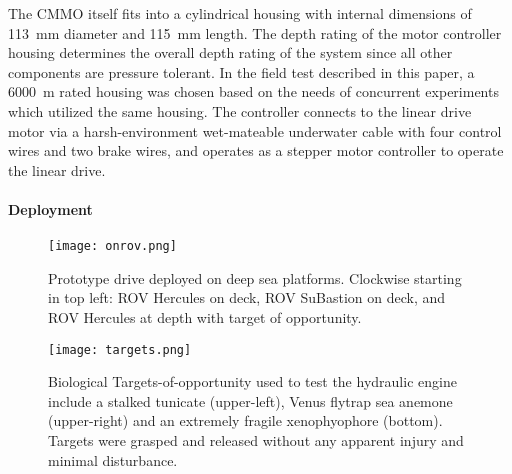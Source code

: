 The CMMO itself fits into a  cylindrical housing with
internal dimensions of \SI{113}{\mm} diameter and \SI{115}{\mm} length. The depth
rating of the motor controller housing determines the overall depth
rating of the system since all other components are pressure tolerant.
In the field test described in this paper, a \SI{6000}{\meter} rated housing
was chosen based on the needs of concurrent experiments which utilized
the same housing. The controller connects to the linear drive motor via
a harsh-environment wet-mateable underwater cable with four control
wires and two brake wires, and operates as a stepper motor controller to
operate the linear drive.


\hypertarget{ch1:deployment}{%
\paragraph{Deployment}\label{ch1:deployment}}

\begin{figure}
\hypertarget{ch1:fig:onrov}{%
\centering
\texttt{[image: onrov.png]}
\caption{Prototype drive deployed on deep sea platforms. Clockwise
starting in top left: \gls{ROV} Hercules on deck, \gls{ROV} SuBastion on deck, and
\gls{ROV} Hercules at depth with target of opportunity.}\label{ch1:fig:onrov}
}
\end{figure}

\begin{figure}
\hypertarget{ch1:fig:targets}{%
\centering
\texttt{[image: targets.png]}
\caption{Biological Targets-of-opportunity used to test the hydraulic
engine include a stalked tunicate (upper-left), Venus flytrap sea
anemone (upper-right) and an extremely fragile xenophyophore (bottom).
Targets were grasped and released without any apparent injury and
minimal disturbance.}\label{ch1:fig:targets}
}
\end{figure}

